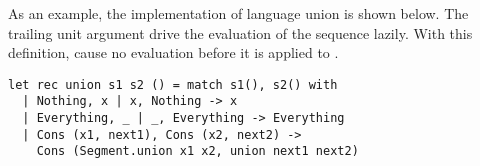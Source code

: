 As an example, the implementation of language union is shown below.
The trailing unit argument \code{()} drive the evaluation of the
sequence lazily. With this definition,  cause no
evaluation before it is applied to \code{()}.
\begin{lstlisting}
let rec union s1 s2 () = match s1(), s2() with
  | Nothing, x | x, Nothing -> x
  | Everything, _ | _, Everything -> Everything
  | Cons (x1, next1), Cons (x2, next2) -> 
    Cons (Segment.union x1 x2, union next1 next2)
\end{lstlisting}






